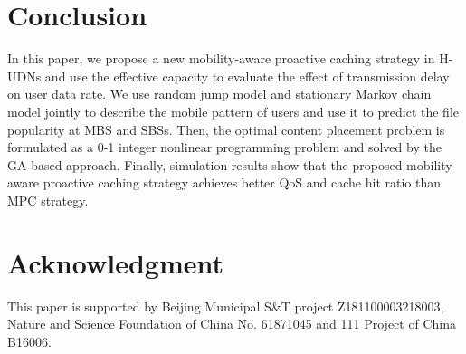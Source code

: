 \documentclass[conference]{IEEEtran}
\begin{document}
\section{Conclusion}

In this paper, we propose a new mobility-aware proactive caching strategy in H-UDNs and use the effective capacity to evaluate the effect of transmission delay on user data rate. We use random jump model and stationary Markov chain model jointly to describe the mobile pattern of users and use it to predict the file popularity at MBS and SBSs. Then, the optimal content placement problem is formulated as a 0-1 integer nonlinear programming problem and solved by the GA-based approach. Finally, simulation results show that the proposed mobility-aware proactive caching strategy achieves better QoS and cache hit ratio than MPC strategy.

\section*{Acknowledgment}

This paper is supported by Beijing Municipal S\&T project Z181100003218003, Nature and Science Foundation of China No. 61871045 and 111 Project of China B16006.



\end{document}
